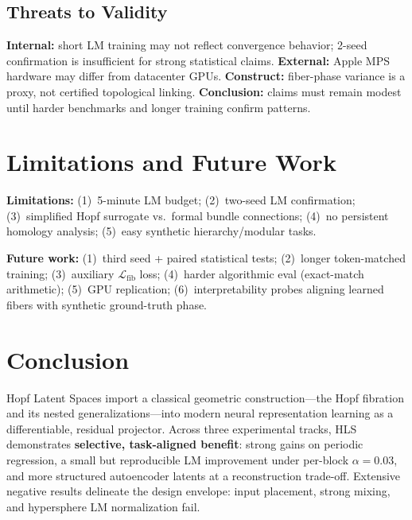 \documentclass[11pt,twocolumn]{article}
\begin{document}
\subsection{Threats to Validity}

\textbf{Internal:} short LM training may not reflect convergence behavior; 2-seed confirmation is insufficient for strong statistical claims. \textbf{External:} Apple MPS hardware may differ from datacenter GPUs. \textbf{Construct:} fiber-phase variance is a proxy, not certified topological linking. \textbf{Conclusion:} claims must remain modest until harder benchmarks and longer training confirm patterns.

\section{Limitations and Future Work}
\label{sec:future}

\textbf{Limitations:} (1)~5-minute LM budget; (2)~two-seed LM confirmation; (3)~simplified Hopf surrogate vs.\ formal bundle connections; (4)~no persistent homology analysis; (5)~easy synthetic hierarchy/modular tasks.

\textbf{Future work:} (1)~third seed + paired statistical tests; (2)~longer token-matched training; (3)~auxiliary $\mathcal{L}_{\mathrm{fib}}$ loss; (4)~harder algorithmic eval (exact-match arithmetic); (5)~GPU replication; (6)~interpretability probes aligning learned fibers with synthetic ground-truth phase.

\section{Conclusion}
\label{sec:conclusion}

Hopf Latent Spaces import a classical geometric construction---the Hopf fibration and its nested generalizations---into modern neural representation learning as a differentiable, residual projector. Across three experimental tracks, HLS demonstrates \textbf{selective, task-aligned benefit}: strong gains on periodic regression, a small but reproducible LM improvement under per-block $\alpha=0.03$, and more structured autoencoder latents at a reconstruction trade-off. Extensive negative results delineate the design envelope: input placement, strong mixing, and hypersphere LM normalization fail.
\end{document}
